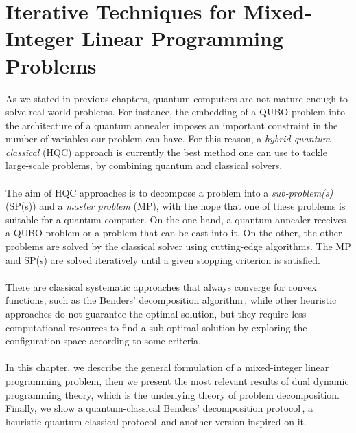 
\chapter{Iterative Techniques for Mixed-Integer Linear Programming Problems} %

\label{Chapter3} %

As we stated in previous chapters, quantum computers are not mature enough to solve real-world problems. For instance, the embedding of a QUBO problem into the architecture of a quantum annealer imposes an important constraint in the number of variables our problem can have. For this reason, a \textit{hybrid quantum-classical} (HQC) approach is currently the best method one can use to tackle large-scale problems, by combining quantum and classical solvers.\\\\
The aim of HQC approaches is to decompose a problem into a \textit{sub-problem(s)} (SP(s)) and a \textit{master problem} (MP), with the hope that one of these problems is suitable for a quantum computer. On the one hand, a quantum annealer receives a QUBO problem or a problem that can be cast into it. On the other, the other problems are solved by the classical solver using cutting-edge algorithms. The MP and SP(s) are solved iteratively until a given stopping criterion is satisfied. \\\\
There are classical systematic approaches that always converge for convex functions, such as the Benders' decomposition algorithm\,\cite{Pereira1991}, while other heuristic approaches do not guarantee the optimal solution, but they require less computational resources to find a sub-optimal solution by exploring the configuration space according to some criteria.\\\\
In this chapter, we describe the general formulation of a mixed-integer linear programming problem, then we present the most relevant results of dual dynamic programming theory, which is the underlying theory of problem decomposition. Finally, we show a quantum-classical Benders' decomposition protocol\,\cite{Zhao2021HybridProgramming}, a heuristic quantum-classical protocol\,\cite{Ding2019ImplementationDesign} and another version inspired on it.
\newpage
